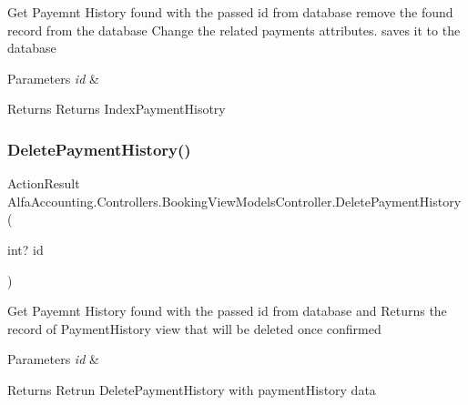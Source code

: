Get Payemnt History found with the passed id from database remove the found record from the database Change the related payments attributes. saves it to the database 


\begin{DoxyParams}{Parameters}
{\em id} & \\
\hline
\end{DoxyParams}
\begin{DoxyReturn}{Returns}
Returns Index\+Payment\+Hisotry
\end{DoxyReturn}
\mbox{\label{class_alfa_accounting_1_1_controllers_1_1_booking_view_models_controller_a3b0b28c4b3de440bbaab4d0179bf5944}} 
\subsubsection{\texorpdfstring{Delete\+Payment\+History()}{DeletePaymentHistory()}}
{\footnotesize\ttfamily Action\+Result Alfa\+Accounting.\+Controllers.\+Booking\+View\+Models\+Controller.\+Delete\+Payment\+History (\begin{DoxyParamCaption}\item[{int?}]{id }\end{DoxyParamCaption})}



Get Payemnt History found with the passed id from database and Returns the record of Payment\+History view that will be deleted once confirmed 


\begin{DoxyParams}{Parameters}
{\em id} & \\
\hline
\end{DoxyParams}
\begin{DoxyReturn}{Returns}
Retrun Delete\+Payment\+History with payment\+History data
\end{DoxyReturn}
\mbox{\label{class_alfa_accounting_1_1_controllers_1_1_booking_view_models_controller_a913b40e51291dff52c980cf14a02343c}} 
